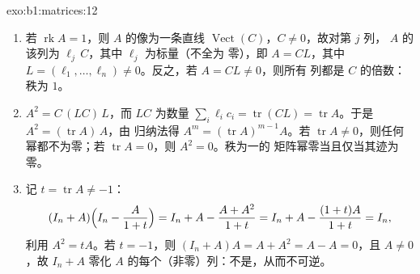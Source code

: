 \begin{solution}{exo:b1:matrices:12}
\begin{enumerate}
  \item 若 $\operatorname{rk} A = 1$，则 $A$ 的像为一条直线
        $\operatorname{Vect}(C)$，$C \neq 0$，故对第 $j$ 列，
        $A$ 的该列为 $\ell_j\,C$，其中 $\ell_j$ 为标量（不全为
        零），即 $A = C L$，其中 $L = (\ell_1, \dots,
        \ell_n) \neq 0$。反之，若 $A = CL \neq 0$，则所有
        列都是 $C$ 的倍数：秩为 $1$。
  \item $A^2 = C\,(L C)\,L$，而 $LC$ 为数量 $\sum_i
        \ell_i c_i = \operatorname{tr}(CL) = \operatorname{tr}
        A$。于是 $A^2 = (\operatorname{tr} A)\,A$，由
        归纳法得 $A^m = (\operatorname{tr} A)^{m-1} A$。若
        $\operatorname{tr} A \neq 0$，则任何幂都不为零；若
        $\operatorname{tr} A = 0$，则 $A^2 = 0$。秩为一的
        矩阵幂零当且仅当其迹为零。
  \item 记 $t = \operatorname{tr} A \neq -1$：
        \[
        (I_n + A)\Bigl(I_n - \frac{A}{1 + t}\Bigr)
        = I_n + A - \frac{A + A^2}{1 + t}
        = I_n + A - \frac{(1 + t)A}{1 + t} = I_n ,
        \]
        利用 $A^2 = tA$。若 $t = -1$，则 $(I_n + A)A = A + A^2 = A
        - A = 0$，且 $A \neq 0$，故 $I_n + A$ 零化
        $A$ 的每个（非零）列：不是，从而不可逆。
\end{enumerate}
\end{solution}

